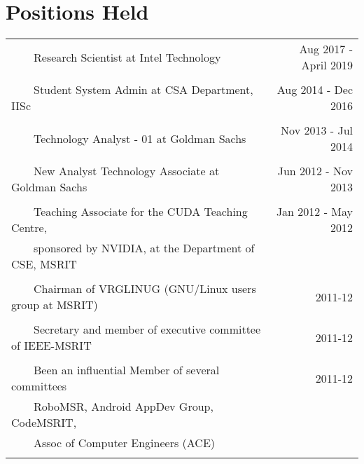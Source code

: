 \documentclass[a4paper,10pt]{article} %
\newcommand{\tabitem}{~~\llap{\textbullet}~~}
\begin{document}
\section{Positions Held}

\begin{tabular}{lr}
	\tabitem Research Scientist at Intel Technology & Aug 2017 - April 2019 \\
	&\\
	\tabitem Student System Admin at CSA Department, IISc & Aug 2014 - Dec 2016 \\
	&\\
	\tabitem Technology Analyst - 01 at Goldman Sachs & Nov 2013 - Jul 2014\\
	&\\
	\tabitem New Analyst Technology Associate at Goldman Sachs & Jun 2012 - Nov 2013\\
	&\\
	\tabitem Teaching Associate for the CUDA Teaching Centre,  & Jan 2012 - May 2012\\
	~~~~sponsored by NVIDIA, at the Department of CSE, MSRIT &  \\
	&\\
	\tabitem Chairman of VRGLINUG (GNU/Linux users group at MSRIT) & 2011-12 \\
	&\\
	\tabitem Secretary and member of executive committee of IEEE-MSRIT & 2011-12 \\
	&\\
	\tabitem Been an influential Member of several committees & 2011-12 \\
	~~~~RoboMSR, Android AppDev Group, CodeMSRIT, & \\
	~~~~Assoc of Computer Engineers (ACE) & \\
	&\\
\end{tabular}

\newpage
\end{document}

